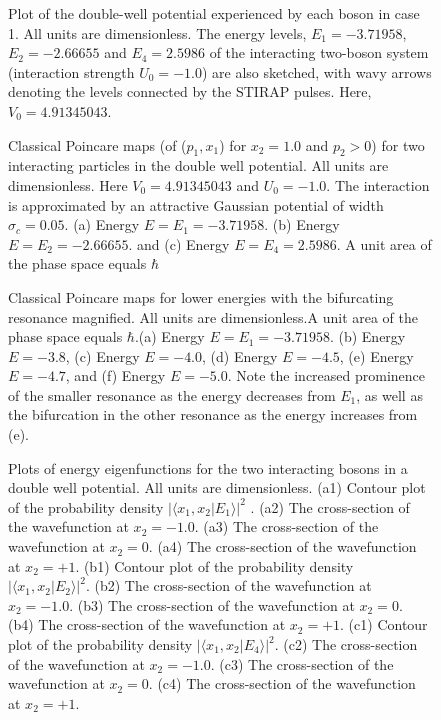 \documentclass{article}
\begin{document}
\pagebreak

\begin{figure} 
\caption{Plot of the double-well potential experienced by each boson in case 1. All units are dimensionless. The energy levels, $E_1=-3.71958$, $E_2=-2.66655$ and $E_4=2.5986$  of the interacting two-boson system (interaction strength  $U_0=-1.0$) are also sketched, with wavy arrows denoting the levels connected by the STIRAP pulses.  Here, $V_0=4.91345043$.}
\label{fig:doublewell}
\end{figure}

\begin{figure} 
\caption{Classical Poincare maps (of  ($p_1,x_1$) for $x_2=1.0$ and $p_2>0$) for two interacting particles in the double well potential. All units are dimensionless. Here $V_0 = 4.91345043$ and $U_0 = -1.0 $. The interaction is approximated by an attractive Gaussian  potential of width $\sigma_c = 0.05$.  (a) Energy $E=E_1=-3.71958$. (b) Energy $E=E_2=-2.66655$. and (c) Energy $E=E_4=2.5986$. A unit area of the phase space equals $\hbar$}
\label{fig:classicalpncr}
\end{figure}

\begin{figure} 
\caption{Classical Poincare maps for lower energies with the bifurcating resonance magnified. All units are dimensionless.A unit area of the phase space equals $\hbar$.(a) Energy $E=E_1=-3.71958$. (b) Energy $E=-3.8$, (c) Energy $E=-4.0$, (d) Energy $E=-4.5$, (e) Energy $E=-4.7$, and (f) Energy $E=-5.0$. Note the increased prominence of the smaller resonance as the energy decreases from $E_1$, as well as the bifurcation in the other resonance as the energy increases from (e).}
\label{fig:bifurcation}
\end{figure}

\begin{figure}
\caption{Plots of energy eigenfunctions for the two interacting bosons in a double well potential. All units are dimensionless. (a1) Contour plot of the  probability density $|\langle x_1,x_2|E_1\rangle|^2$ .  (a2) The cross-section of the wavefunction at $x_2 = -1.0$. (a3) The cross-section of the wavefunction at $x_2 = 0$.  (a4) The cross-section of the wavefunction at $x_2 = +1$. (b1) Contour plot of the  probability density $|\langle x_1,x_2|E_2\rangle|^2$.  (b2) The cross-section of the wavefunction at $x_2 = -1.0$. (b3) The cross-section of the wavefunction at $x_2 = 0$. (b4) The cross-section of the wavefunction at $x_2 = +1$. (c1) Contour plot of the  probability density $|\langle x_1,x_2|E_4\rangle|^2$. (c2) The cross-section of the wavefunction at $x_2 = -1.0$. (c3) The cross-section of the wavefunction at $x_2 = 0$. (c4)  The cross-section of the wavefunction at $x_2 = +1$.}
\label{fig:wavefunctions}
\end{figure}
\end{document}
